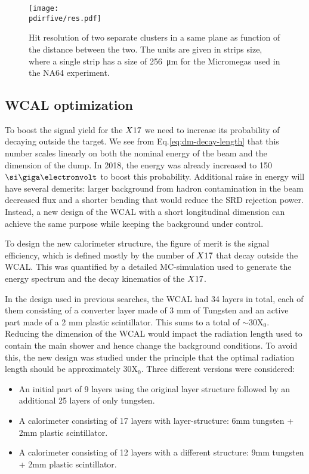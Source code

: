 \begin{figure}[tbh!]
  \centering
  \texttt{[image: \\pdirfive/res.pdf]}
  \caption[Hit resolution as function of the two cluster distance]{Hit resolution of two separate clusters in a same plane as function of the distance between the two. The units are given in strips size, where a single strip has a size of \SI{256}{\micro\meter} for the Micromegas used in the NA64 experiment.}
  \label{fig:res-hit}
\end{figure}

\subsection{WCAL optimization}
\label{ch5:sec:new-vismode-setup-wcal}

To boost the signal yield for the $X17$ we need to increase its probability of decaying outside the target. We see from Eq.\ref{eq:dm-decay-length} that this number scales linearly on both the nominal energy of the beam and the dimension of the dump. In 2018, the energy was already increased to 150 $\gev$ to boost this probability. Additional raise in energy will have several demerits: larger background from hadron contamination in the beam decreased flux and a shorter bending that would reduce the SRD rejection power. Instead, a new design of the WCAL with a short longitudinal dimension can achieve the same purpose while keeping the background under control.

To design the new calorimeter structure, the figure of merit is the signal efficiency, which is defined mostly by the number of $X17$ that decay outside the WCAL. This was quantified by a detailed MC-simulation used to generate the energy spectrum and the decay kinematics of the $X17$.

In the design used in previous searches, the WCAL had 34 layers in total, each of them consisting of a converter layer made of 3 mm of Tungsten and an active part made of a 2 mm plastic scintillator. This sums to a total of $\sim$30X$_0$. Reducing the dimension of the WCAL would impact the radiation length used to contain the main shower and hence change the background conditions. To avoid this, the new design was studied under the principle that the optimal radiation length should be approximately 30X$_0$. Three different versions were considered:

\begin{itemize}
\item An initial part of 9 layers using the original layer structure followed by an additional 25 layers of only tungsten.
\item A calorimeter consisting of 17 layers with layer-structure: 6mm tungsten + 2mm plastic scintillator.
\item A calorimeter consisting of 12 layers with a different structure: 9mm tungsten + 2mm plastic scintillator.
\end{itemize}

